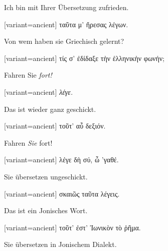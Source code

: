 Ich bin mit Ihrer Übersetzung zufrieden.

\switchcolumn

\begin{greek}[variant=ancient]%
ταῦτα μ' ἤρεσας λέγων.

\end{greek}%
\switchcolumn*

Von wem haben sie Griechisch gelernt?

\switchcolumn

\begin{greek}[variant=ancient]%
τίς σ' ἐδίδαξε τὴν ἑλληνικὴν φωνήν;

\end{greek}%
\switchcolumn*

Fahren Sie \emph{fort!}

\switchcolumn

\begin{greek}[variant=ancient]%
\emph{λέγε.}

\end{greek}%
\switchcolumn*

Das ist wieder ganz geschickt.

\switchcolumn

\begin{greek}[variant=ancient]%
τοῦτ' αὖ δεξιόν.

\end{greek}%
\switchcolumn*

Fahren \emph{Sie} fort!

\switchcolumn

\begin{greek}[variant=ancient]%
λέγε δὴ σύ, ὦ 'γαθέ.

\end{greek}%
\switchcolumn*

Sie übersetzen ungeschickt.

\switchcolumn

\begin{greek}[variant=ancient]%
σκαιῶς ταῦτα λέγεις.

\end{greek}%
\switchcolumn*

Das ist ein Jonisches Wort.

\switchcolumn

\begin{greek}[variant=ancient]%
τοῦτ' ἐστ' Ἰωνικὸν τὸ ῥῆμα.

\end{greek}%
\switchcolumn*

Sie übersetzen in Jonischem Dialekt.

